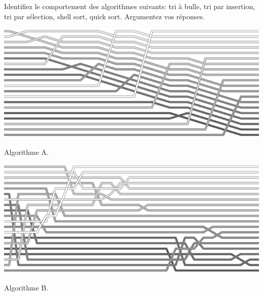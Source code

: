 \documentclass[10pt]{article}\usepackage[nu]{esial}
\begin{document}
\Question Identifiez le comportement des algorithmes suivants: tri à bulle, tri
par insertion, tri par sélection, shell sort, quick sort. Argumentez vos
réponses. 

\noindent\begin{minipage}{.49\linewidth}
  \includegraphics[width=\linewidth]{insertion.png}

  \centerline{Algorithme A.}
\end{minipage}\hfill\begin{minipage}{.49\linewidth}
  \includegraphics[width=\linewidth]{quick.png}

  \centerline{Algorithme B.}
\end{minipage}
\end{document}
